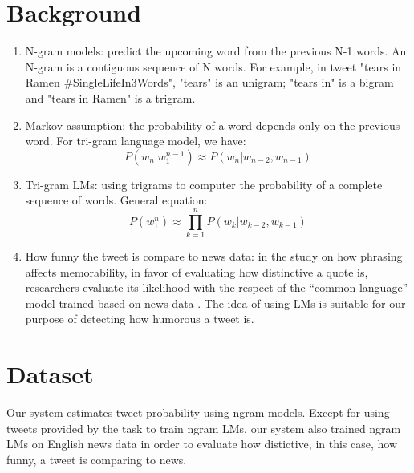 \documentclass[a0,portrait]{a0poster}
\begin{document}
\begin{multicols}{2}
\section*{\LARGE Background}
\begin{enumerate}
\item N-gram models: predict the upcoming word from the previous N-1 words. An N-gram is a contiguous sequence of N words. For example, in tweet "tears in Ramen \#SingleLifeIn3Words", "tears" is an unigram; "tears in" is a bigram and "tears in Ramen" is a trigram.
\item Markov assumption: the probability of a word depends only on the previous word. For tri-gram language model, we have:
\begin{equation}
P(w_n|w_1^{n-1})\approx P(w_n|w_{n-2}, w_{n-1})
\end{equation}
\item Tri-gram LMs: using trigrams to computer the probability of a complete sequence of words. General equation:
\begin{equation}
P(w_1^n)\approx \prod_{k=1}^{n} P(w_k|w_{k-2}, w_{k-1})
\end{equation}
\item How funny the tweet is compare to news data: in the study on how phrasing affects memorability, in favor of evaluating how distinctive a quote is, researchers evaluate its likelihood with the respect of the “common language” model trained based on news data \cite{hello}. The idea of using LMs is suitable for our purpose of detecting how humorous a tweet is. 
\end{enumerate}

\color{Navy}

\section*{\LARGE Dataset}
Our system estimates tweet probability using ngram models. Except for using tweets provided by the task to train ngram LMs, our system also trained ngram LMs on English news data in order to evaluate how distictive, in this case, how funny, a tweet is comparing to news. 


\end{multicols}
\end{document}
